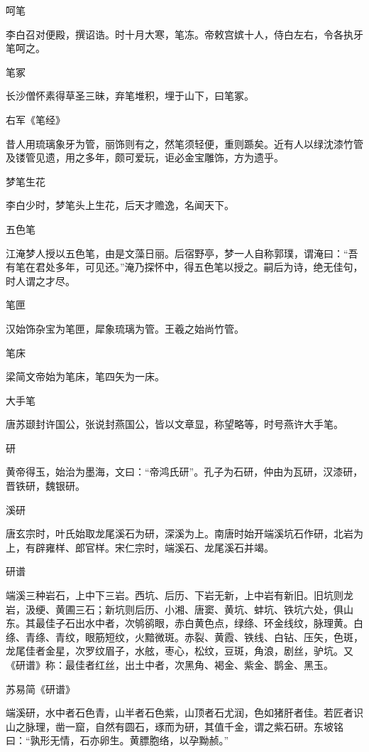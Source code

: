 \documentclass[a4paper,12pt,UTF8,twoside]{ctexbook}
\begin{document}
    呵笔
    
    李白召对便殿，撰诏诰。时十月大寒，笔冻。帝敕宫嫔十人，侍白左右，令各执牙笔呵之。
    
    笔冢
    
    长沙僧怀素得草圣三昧，弃笔堆积，埋于山下，曰笔冢。
    
    右军《笔经》
    
    昔人用琉璃象牙为管，丽饰则有之，然笔须轻便，重则踬矣。近有人以绿沈漆竹管及镂管见遗，用之多年，颇可爱玩，讵必金宝雕饰，方为遗乎。
    
    梦笔生花
    
    李白少时，梦笔头上生花，后天才赡逸，名闻天下。
    
    五色笔
    
    江淹梦人授以五色笔，由是文藻日丽。后宿野亭，梦一人自称郭璞，谓淹曰：“吾有笔在君处多年，可见还。”淹乃探怀中，得五色笔以授之。嗣后为诗，绝无佳句，时人谓之才尽。
    
    笔匣
    
    汉始饰杂宝为笔匣，犀象琉璃为管。王羲之始尚竹管。
    
    笔床
    
    梁简文帝始为笔床，笔四矢为一床。
    
    大手笔
    
    唐苏颋封许国公，张说封燕国公，皆以文章显，称望略等，时号燕许大手笔。
    
    研
    
    黄帝得玉，始治为墨海，文曰：“帝鸿氏研”。孔子为石研，仲由为瓦研，汉漆研，晋铁研，魏银研。
    
    溪研
    
    唐玄宗时，叶氏始取龙尾溪石为研，深溪为上。南唐时始开端溪坑石作研，北岩为上，有辟雍样、郎官样。宋仁宗时，端溪石、龙尾溪石并竭。
    
    研谱
    
    端溪三种岩石，上中下三岩。西坑、后历、下岩无新，上中岩有新旧。旧坑则龙岩，汲绠、黄圃三石；新坑则后历、小湘、唐窦、黄坑、蚌坑、铁坑六处，俱山东。其最佳子石出水中者，次鸲鹆眼，赤白黄色点，绿绦、环金线纹，脉理黄。白绦、青绦、青纹，眼筋短纹，火黯微斑。赤裂、黄霞、铁线、白钻、压矢，色斑，龙尾佳者金星，次罗纹眉子，水舷，枣心，松纹，豆斑，角浪，剧丝，驴坑。又《研谱》称：最佳者红丝，出土中者，次黑角、褐金、紫金、鹊金、黑玉。
    
    苏易简《研谱》
    
    端溪研，水中者石色青，山半者石色紫，山顶者石尤润，色如猪肝者佳。若匠者识山之脉理，凿一窟，自然有圆石，琢而为研，其值千金，谓之紫石研。东坡铭曰：“孰形无情，石亦卵生。黄膘胞络，以孕黝赪。”
    
\end{document}
